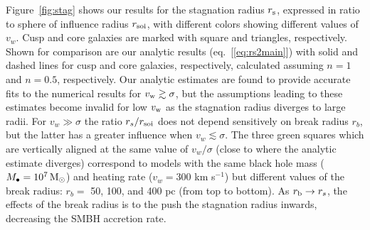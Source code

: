 \documentclass[usenatbib,fleqn]{mn2e}
\newcommand{\rs}{r_s}
\newcommand{\Mbh}[1][]{M_{\bullet#1}}
\newcommand{\soi}{\rm soi}
\newcommand{\rsoi}{r_{\soi}}
\begin{document}
Figure~\ref{fig:stag} shows our results for the stagnation radius $r_{\rm s}$, expressed in ratio to sphere of influence radius $r_{\rm soi}$, with different colors showing different values of $v_{w}$.  Cusp and core galaxies are marked with square and triangles, respectively.  Shown for comparison are our analytic results (eq.~[\ref{eq:rs2main}]) with solid and dashed lines for cusp and core galaxies, respectively, calculated assuming $n = 1$ and $n= 0.5$, respectively.  Our analytic estimates are found to provide accurate fits to the numerical results for $v_{\rm w} \gtrsim \sigma$, but the assumptions leading to these estimates become invalid for low $v_{\rm w}$ as the stagnation radius diverges to large radii.  For $v_{w} \gg \sigma$ the ratio $\rs/\rsoi$ does not depend sensitively on break radius $r_{b}$, but the latter has a greater influence when $v_{w} \lesssim \sigma$.  The three green squares which are vertically aligned at the same value of $v_{w}/\sigma$ (close to where the analytic estimate diverges) correspond to models with the same black hole mass ($\Mbh = 10^7 \Msun$) and heating rate ($v_w = 300$ km s$^{-1}$) but different values of the break radius: $r_{b} = $ 50, 100, and 400 pc (from top to bottom).  As $r_{\rm b} \rightarrow r_{s}$, the effects of the break radius is to the push the stagnation radius inwards, decreasing the SMBH accretion rate.    
\end{document}
